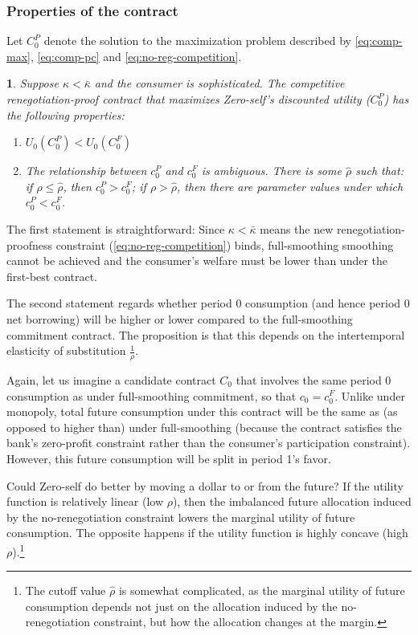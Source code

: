\documentclass[11pt,english]{article}
\theoremstyle{plain}
\newtheorem{prop}{\protect\propositionname}
\theoremstyle{definition}
\providecommand{\propositionname}{Proposition}
\begin{document}
\subsubsection{Properties of the contract}

Let $C_{0}^{P}$ denote the solution to the maximization
problem described by \ref{eq:comp-max}, \ref{eq:comp-pc} and \ref{eq:no-reg-competition}. 
\begin{prop}
Suppose $\kappa<\bar{\kappa}$ and the consumer is sophisticated.
The competitive renegotiation-proof contract that
maximizes Zero-self's discounted utility ($C_{0}^{P}$) has the following
properties:
\begin{enumerate} [label=\alph*)]
\item $U_{0}\left(C_{0}^{P}\right)<U_{0}\left(C_{0}^{F}\right)$

\item The relationship between $c_{0}^{P}$ and $c_{0}^{F}$ is ambiguous.
There is some $\hat{\rho}$ such that: if $\rho\leq\hat{\rho}$, then
$c_{0}^{P}>c_{0}^{F}$; if $\rho>\hat{\rho}$, then there are parameter
values under which $c_{0}^{P}<c_{0}^{F}$. 
\end{enumerate}
\end{prop}
The first statement is straightforward: Since $\kappa<\bar{\kappa}$
means the new renegotiation-proofness constraint (\ref{eq:no-reg-competition})
binds, full-smoothing smoothing cannot be achieved and the consumer's
welfare must be lower than under the first-best contract.

The second statement regards whether period 0 consumption  (and hence period 0 net borrowing) will be higher or lower compared to the full-smoothing
commitment contract. The proposition is that this depends on the intertemporal elasticity of substitution $\frac{1}{\rho}$.

Again, let us imagine a candidate contract $C_{0}$ that
involves the same period 0 consumption as under full-smoothing commitment,
so that $c_{0}=c_{0}^{F}$. Unlike under monopoly, total future consumption under this contract will be the same as (as opposed to higher than) under full-smoothing (because the contract satisfies the bank's zero-profit constraint rather than the consumer's participation constraint). However, this future consumption will be split in period 1's favor.

Could Zero-self do better by moving a dollar to or from the future? If the utility function is relatively linear (low $\rho$), then the imbalanced future allocation induced by the no-renegotiation constraint lowers the marginal utility of future consumption. The opposite happens if the utility function is highly concave (high $\rho$).\footnote{The  cutoff value $\hat{\rho}$ is somewhat
complicated, as the marginal utility of future consumption depends not just on the allocation induced by the no-renegotiation constraint, but how the allocation changes at the margin.}
\end{document}
